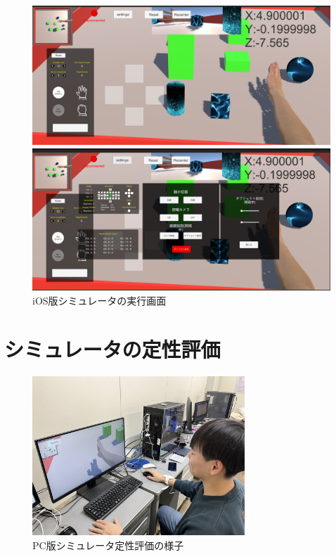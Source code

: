 \documentclass{ltjsreport}
\begin{document}
		\begin{figure}[H]
		\centering
		\begin{minipage}{0.75\columnwidth}
		\centering
		\includegraphics[width = \columnwidth]{../figs/iOSnomal.png}
		\end{minipage}
		\hspace{0.04\columnwidth}
		\begin{minipage}{0.75\columnwidth}
		\centering
		\includegraphics[width = \columnwidth]{../figs/iOSmenu.png}
		\end{minipage}
		\caption{iOS版シミュレータの実行画面}
		\label{fig:iOSsimulate}
		\end{figure}

	\section{シミュレータの定性評価}
		\begin{figure}[H]
		\centering
		\includegraphics[width = 8cm]{../figs/IMG_5132.JPG}
		\caption{PC版シミュレータ定性評価の様子}
		\label{fig:evaluationPC}
		\end{figure}
\end{document}
